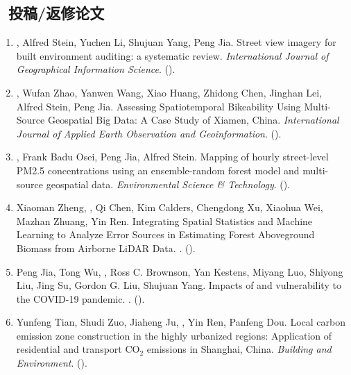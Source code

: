 \subsection*{\texorpdfstring{\faBook\ 投稿/返修论文}{投稿/返修论文}}
\begin{enumerate}
\item
    \Shaoqing, Alfred Stein, Yuchen Li, Shujuan Yang, Peng Jia.
    Street view imagery for built environment auditing: a systematic review.
    \textit{International Journal of Geographical Information Science}. 
    (\Revision).
\item
    \Shaoqing, Wufan Zhao, Yanwen Wang, Xiao Huang, Zhidong Chen, Jinghan Lei, Alfred Stein, Peng Jia.
    Assessing Spatiotemporal Bikeability Using Multi-Source Geospatial Big Data: A Case Study of Xiamen, China.
    \textit{International Journal of Applied Earth Observation and Geoinformation}. 
    (\Review).
\item
    \Shaoqing, Frank Badu Osei, Peng Jia, Alfred Stein.
    Mapping of hourly street-level PM2.5 concentrations using an ensemble-random forest model and multi-source geospatial data.
    \textit{Environmental Science \& Technology}. 
    (\Submitted).
\item
    Xiaoman Zheng, \Shaoqing, Qi Chen, Kim Calders, Chengdong Xu, Xiaohua Wei, Mazhan Zhuang, Yin Ren.
    Integrating Spatial Statistics and Machine Learning to Analyze Error Sources in Estimating Forest Aboveground Biomass from Airborne LiDAR Data.
    \textit{}. 
    (\Revision).
\item
    Peng Jia, Tong Wu, \Shaoqing, Ross C. Brownson, Yan Kestens, Miyang Luo, Shiyong Liu,  Jing Su, Gordon G. Liu, Shujuan Yang.
    Impacts of and vulnerability to the COVID-19 pandemic.
    \textit{}. 
    (\Submitted).
\item
    Yunfeng Tian, Shudi Zuo, Jiaheng Ju, \Shaoqing, Yin Ren, Panfeng Dou.
    Local carbon emission zone construction in the highly urbanized regions: Application of residential and transport CO$_2$ emissions in Shanghai, China.
    \textit{Building and Environment}.
    (\Review). 
\end{enumerate}